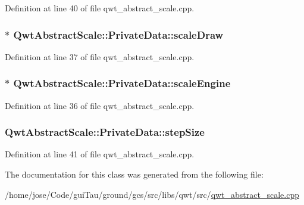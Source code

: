 Definition at line 40 of file qwt\-\_\-abstract\-\_\-scale.\-cpp.

\hypertarget{class_qwt_abstract_scale_1_1_private_data_aa639778c788fc3096dc99663557f1e16}{
\subsubsection[{scale\-Draw}]{$\ast$ Qwt\-Abstract\-Scale\-::\-Private\-Data\-::scale\-Draw}}\label{class_qwt_abstract_scale_1_1_private_data_aa639778c788fc3096dc99663557f1e16}


Definition at line 37 of file qwt\-\_\-abstract\-\_\-scale.\-cpp.

\hypertarget{class_qwt_abstract_scale_1_1_private_data_a27c6d6056bb7217c16dea852430b6d27}{
\subsubsection[{scale\-Engine}]{$\ast$ Qwt\-Abstract\-Scale\-::\-Private\-Data\-::scale\-Engine}}\label{class_qwt_abstract_scale_1_1_private_data_a27c6d6056bb7217c16dea852430b6d27}


Definition at line 36 of file qwt\-\_\-abstract\-\_\-scale.\-cpp.

\hypertarget{class_qwt_abstract_scale_1_1_private_data_ad89176710ff5ac79829efaaf1909d893}{
\subsubsection[{step\-Size}]{ Qwt\-Abstract\-Scale\-::\-Private\-Data\-::step\-Size}}\label{class_qwt_abstract_scale_1_1_private_data_ad89176710ff5ac79829efaaf1909d893}


Definition at line 41 of file qwt\-\_\-abstract\-\_\-scale.\-cpp.



The documentation for this class was generated from the following file\-:\begin{DoxyCompactItemize}
\item 
/home/jose/\-Code/gui\-Tau/ground/gcs/src/libs/qwt/src/\hyperlink{qwt__abstract__scale_8cpp}{qwt\-\_\-abstract\-\_\-scale.\-cpp}\end{DoxyCompactItemize}
